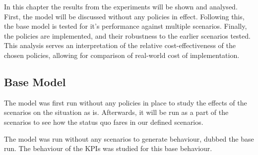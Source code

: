 In this chapter the results from the experiments will be shown and analysed. First, the model will be discussed without any policies in effect. Following this, the base model is tested for it's performance against multiple scenarios. Finally, the policies are implemented, and their robustness to the earlier scenarios tested. This analysis serves an interpretation of the relative cost-effectiveness of the chosen policies, allowing for comparison of real-world cost of implementation. 

\subsection{Base Model}
\label{s:baserun}
The model was first run without any policies in place to study the effects of the scenarios on the situation as is. Afterwards, it will be run as a part of the scenarios to see how the status quo fares in our defined scenarios. 

The model was run without any scenarios to generate behaviour, dubbed the base run. The behaviour of the KPIs was studied for this base behaviour.

